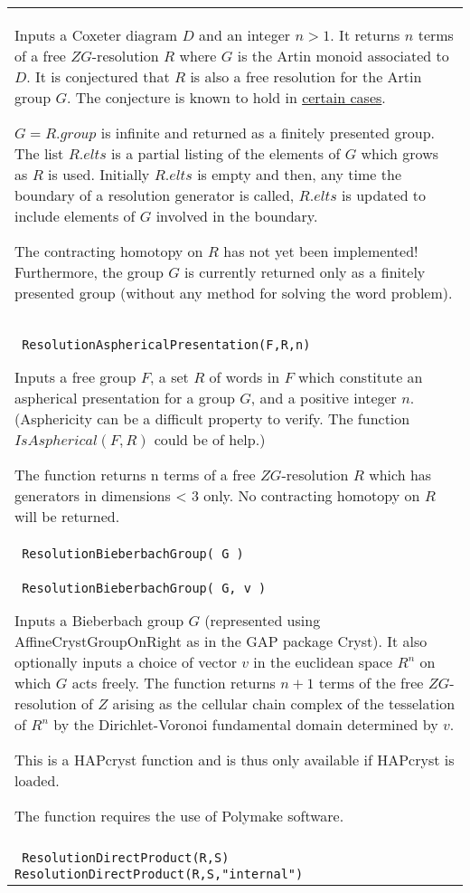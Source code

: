\documentclass[a4paper,11pt]{report}
\begin{document}
{\begin{center}
\begin{tabular}{|l|}
 Inputs a Coxeter diagram $D$ and an integer $n>1$. It returns $n$ terms of a free $ZG$-resolution $R$ where $G$ is the Artin monoid associated to $D$. It is conjectured that $R$ is also a free resolution for the Artin group $G$. The conjecture is known to hold in \href{About/aboutArtinGroups.html} {certain cases}.

 $G=R.group$ is infinite and returned as a finitely presented group. The list $R.elts$ is a partial listing of the elements of $G$ which grows as $R$ is used. Initially $R.elts$ is empty and then, any time the boundary of a resolution generator is called, $R.elts$ is updated to include elements of $G$ involved in the boundary.

 The contracting homotopy on $R$ has not yet been implemented! Furthermore, the group $G$ is currently returned only as a finitely presented group (without any method
for solving the word problem). \\
 \index{ResolutionAsphericalPresentation} \texttt{ ResolutionAsphericalPresentation(F,R,n)} 

 Inputs a free group $F$, a set $R$ of words in $F$ which constitute an aspherical presentation for a group $G$, and a positive integer $n$. (Asphericity can be a difficult property to verify. The function $IsAspherical(F,R)$ could be of help.)

 The function returns n terms of a free $ZG$-resolution $R$ which has generators in dimensions {\textless} 3 only. No contracting homotopy
on $R$ will be returned. \\
 \index{ResolutionBieberbachGroup (HAPcryst)} \texttt{ ResolutionBieberbachGroup( G ) } \\
 \texttt{ ResolutionBieberbachGroup( G, v ) } 

 Inputs a Bieberbach group $G$ (represented using AffineCrystGroupOnRight as in the GAP package Cryst). It
also optionally inputs a choice of vector $v$ in the euclidean space $R^n$ on which $G$ acts freely. The function returns $n+1$ terms of the free $ZG$-resolution of $Z$ arising as the cellular chain complex of the tesselation of $R^n$ by the Dirichlet-Voronoi fundamental domain determined by $v$. 

 This is a HAPcryst function and is thus only available if HAPcryst is loaded. 

 The function requires the use of Polymake software. \\
 \index{ResolutionDirectProduct} \texttt{ ResolutionDirectProduct(R,S) } {\nobreakspace} \texttt{ ResolutionDirectProduct(R,S,"internal")} 


\end{tabular}
\end{center}}
\end{document}
